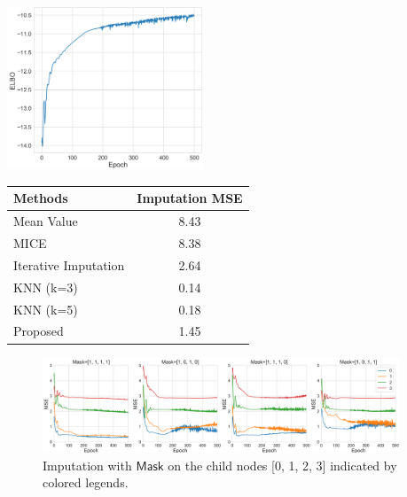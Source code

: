 \documentclass{article} %
\begin{document}
 \begin{minipage}{\textwidth}
  \begin{minipage}[b]{0.49\textwidth}
    \centering
   \includegraphics[width=2.3in]{fig/elbo.png}
    \label{fig:elbo}
  \end{minipage}
  \hfill
  \begin{minipage}[b]{0.49\textwidth}
    \centering
 \begin{tabular}{l | c  }\hline
Methods & Imputation MSE  \\
\hline
Mean Value &8.43 \\
\hline
MICE &8.38 \\
\hline
Iterative Imputation & 2.64 \\
\hline
KNN (k=3) &0.14 \\
\hline
KNN (k=5) &0.18 \\
\hline
Proposed &  1.45  \\  
\hline
\end{tabular}
\vspace{0.4in}
       \label{tab:causality2}
    \end{minipage}
  \end{minipage}  
  

\begin{figure}[!htbp]
    \centering
    \includegraphics[width=0.95\textwidth]{fig/mse.png}
    \caption{Imputation with $\mathsf{Mask}$ on the child nodes [0, 1, 2, 3] indicated by colored legends. }
    \label{fig:mse}
\end{figure}
\end{document}
